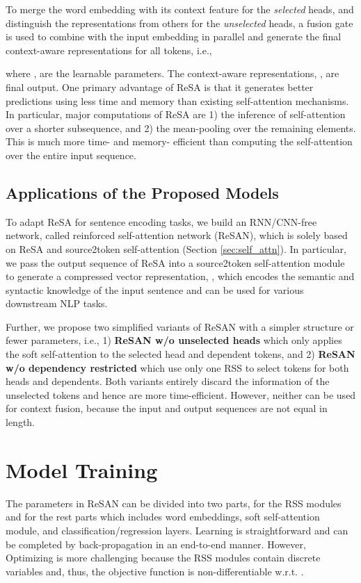 \documentclass{article}
\begin{document}
To merge the word embedding with its context feature for the \textit{selected} heads, and distinguish the representations from others for the \textit{unselected} heads, a  fusion gate is used to combine  with the input embedding  in parallel and generate the final context-aware representations for all tokens, i.e., 

where ,  are the learnable parameters. The context-aware representations, , are final output. 
One primary advantage of ReSA is that it generates better predictions using less time and memory than existing self-attention mechanisms. In particular, major computations of ReSA are 1) the inference of self-attention over a shorter subsequence, and 2) the mean-pooling over the remaining elements. This is much more time- and memory- efficient than computing the self-attention over the entire input sequence. 

\subsection{Applications of the Proposed Models} \label{sec:applications}

To adapt ReSA for sentence encoding tasks, we build an RNN/CNN-free network, called reinforced self-attention network (ReSAN), which is solely based on ReSA and source2token self-attention (Section \ref{sec:self_attn}). In particular, we pass the output sequence of ReSA into a source2token self-attention module to generate a compressed vector representation, , which encodes the semantic and syntactic knowledge of the input sentence and can be used for various downstream NLP tasks.

Further, we propose two simplified variants of ReSAN with a simpler structure or fewer parameters, i.e., 1) \textbf{ReSAN w/o unselected heads} which only applies the soft self-attention to the selected head and dependent tokens, and 2) \textbf{ReSAN w/o dependency restricted} which use only one RSS to select tokens for both heads and dependents. Both variants entirely discard the information of the unselected tokens and hence are more time-efficient. However, neither can be used for context fusion, because the input and output sequences are not equal in length. 


\section{Model Training} \label{sec:model_training}

The parameters in ReSAN can be divided into two parts,  for the RSS modules and  for the rest parts which includes word embeddings, soft self-attention module, and classification/regression layers. Learning  is straightforward and can be completed by back-propagation in an end-to-end manner. However, Optimizing  is more challenging because the RSS modules contain discrete variables  and, thus, the objective function is non-differentiable w.r.t. . 
\end{document}
